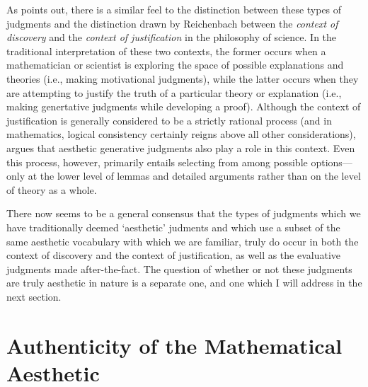 \documentclass[a4paper,man,natbib]{apa6}
\begin{document}
As \cite{ivanova_aesthetic_2017} points out, there is a similar feel to the distinction between these types of judgments 
and the distinction drawn by Reichenbach \citep{sep-reichenbach} between the \textit{context of discovery} and the
\textit{context of justification} in the philosophy of science. In the traditional interpretation of these two contexts,
the former occurs when a mathematician or scientist is exploring the space of possible explanations and theories (i.e., 
making motivational judgments), while the latter occurs when they are attempting to justify the truth of a particular 
theory or explanation (i.e., making genertative judgments while developing a proof). Although the context of justification 
is generally considered to be a strictly rational process (and in mathematics, logical consistency certainly reigns above all other
considerations), \cite{cellucci_mathematical_2015} argues that aesthetic generative judgments also play a role 
in this context. Even this process, however, primarily entails selecting from among possible options---only at the
lower level of lemmas and detailed arguments rather than on the level of theory as a whole.

There now seems to be a general consensus that the types of judgments which we have traditionally deemed `aesthetic' judments
and which use a subset of the same aesthetic vocabulary with which we are familiar, truly do occur in both the context
of discovery and the context of justification, as well as the evaluative judgments made after-the-fact. The question of 
whether or not these judgments are truly aesthetic in nature is a separate one, and one which I will address in the next
section. 



\section{Authenticity of the Mathematical Aesthetic}
\end{document}
